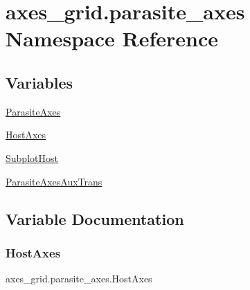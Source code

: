 \hypertarget{namespaceaxes__grid_1_1parasite__axes}{}\section{axes\+\_\+grid.\+parasite\+\_\+axes Namespace Reference}
\label{namespaceaxes__grid_1_1parasite__axes}
\subsection*{Variables}
\begin{DoxyCompactItemize}
\item 
\hyperlink{namespaceaxes__grid_1_1parasite__axes_a8fce0b2eb4b747e26e360060b9eaf339}{Parasite\+Axes}
\item 
\hyperlink{namespaceaxes__grid_1_1parasite__axes_a7a8f7d1726e60e982679fc4c121aac96}{Host\+Axes}
\item 
\hyperlink{namespaceaxes__grid_1_1parasite__axes_a0f30fb0b0f172eb382fbb2b3e9447e57}{Subplot\+Host}
\item 
\hyperlink{namespaceaxes__grid_1_1parasite__axes_ae12a7a4e0ccce47431857dd5a74bf833}{Parasite\+Axes\+Aux\+Trans}
\end{DoxyCompactItemize}


\subsection{Variable Documentation}
\mbox{\label{namespaceaxes__grid_1_1parasite__axes_a7a8f7d1726e60e982679fc4c121aac96}} 
\subsubsection{\texorpdfstring{Host\+Axes}{HostAxes}}
{\footnotesize\ttfamily axes\+\_\+grid.\+parasite\+\_\+axes.\+Host\+Axes}

\mbox{\label{namespaceaxes__grid_1_1parasite__axes_a8fce0b2eb4b747e26e360060b9eaf339}} 
